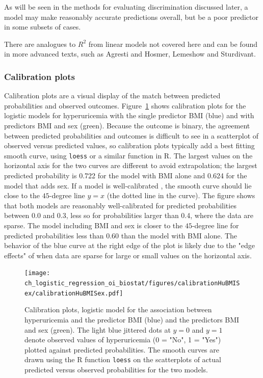 As will be seen in the methods for evaluating discrimination discussed later,  a model may make reasonably accurate predictions overall, but be a poor predictor in some subsets of cases.

There are analogues to $R^2$ from linear models not covered here and can be found in more advanced texts, such as Agresti and Hosmer, Lemeshow and Sturdivant.


\subsubsection{Calibration plots}

Calibration plots are a visual display of the match between predicted probabilities and observed outcomes. Figure~\ref{figure:calibrationHuBMISex} shows calibration plots for the logistic models for hyperuricemia with the single predictor BMI (blue) and with predictors BMI and sex (green).  Because the outcome is binary, the agreement between predicted probabilities and outcomes is difficult to see in a scatterplot of observed versus predicted values, so calibration plots typically add a best fitting smooth curve, using \texttt{loess} or a similar function in \textsf{R}. The largest values on the horizontal axis for the two curves are different to avoid extrapolation; the largest predicted probability is 0.722 for the model with BMI alone and 0.624 for the model that adds sex. If a model is well-calibrated , the smooth curve should lie close to the $45$-degree line $y = x$ (the dotted line in the curve).  The figure shows that both models are reasonably well-calibrated for predicted probabilities between 0.0 and 0.3, less so for probabilities larger than 0.4, where the data are sparse.  The model including BMI and sex is closer to the $45$-degree line for predicted probabilities less than $0.60$ than the model with BMI alone. The behavior of the blue curve at the right edge of the plot is likely due to the "edge effects" 
of  when data are sparse for large or small values on the horizontal axis.

\begin{figure}[!tbh]
  \centering
  \texttt{[image: ch\_logistic\_regression\_oi\_biostat/figures/calibrationHuBMISex/calibrationHuBMISex.pdf]}
    \caption{Calibration plots, logistic model for the association between hyperuricemia and the predictor BMI (blue) and the predictors BMI and sex (green). The light blue jittered dots at  $y = 0$ and $y = 1$ denote observed values of hyperuricemia (0 = "No", 1 = "Yes") plotted against predicted probabilities.   The smooth curves are drawn using the \textsf{R} function \texttt{loess} on the scatterplots of actual predicted versus observed probabilities for the two models.}
   \label{figure:calibrationHuBMISex}
\end{figure}

